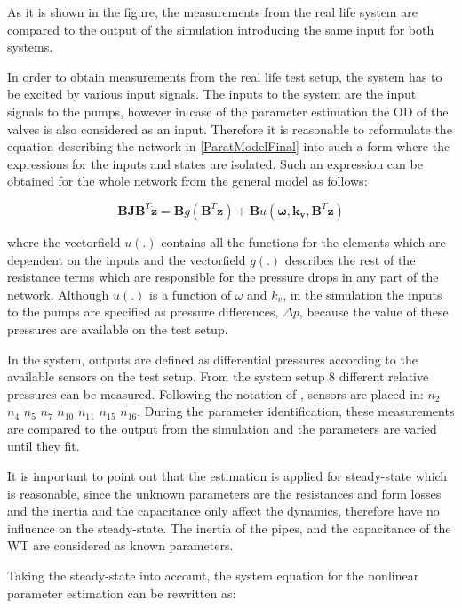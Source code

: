 As it is shown in the figure, the measurements from the real life system are compared to the output of the simulation introducing the same input for both systems. 

In order to obtain measurements from the real life test setup, the system has to be excited by various input signals. The inputs to the system are the input signals to the pumps, however in case of the parameter estimation the OD of the valves is also considered as an input. Therefore it is reasonable to reformulate the equation describing the network in \eqref{ParatModelFinal} into such a form where the expressions for the inputs and states are isolated. Such an expression can be obtained for the whole network from the general model as follows: 

\begin{equation}
 \pmb{B}\pmb{J {B}}^T \pmb{\dot{z}} = \pmb{B} g(\pmb{B}^T \pmb{z})+ \pmb{B} u(\pmb{\omega},\pmb{k_v	}, \pmb{B}^T \pmb{z})
 \label{InputOutputmodel}
\end{equation}

where the vectorfield $u(.)$ contains all the functions for the elements which are dependent on the inputs and the vectorfield $g(.)$ describes the rest of the resistance terms which are responsible for the pressure drops in any part of the network. Although $u(.)$ is a function of $\omega$ and $k_v$, in the simulation the inputs to the pumps are specified as pressure differences, $\Delta p$, because the value of these pressures are available on the test setup.

In the system, outputs are defined as differential pressures according to the available sensors on the test setup. From the system setup $8$ different relative pressures can be measured. Following the notation of , sensors are placed in: 
$n_2$ $n_4$ $n_5$ $n_7$ $n_{10}$ $n_{11}$ $n_{15}$ $n_{16}$. During the parameter identification, these measurements are compared to the output from the simulation and the parameters are varied until they fit.

It is important to point out that the estimation is applied for steady-state which is reasonable, since the unknown parameters are the resistances and form losses and the inertia and the capacitance only affect the dynamics, therefore have no influence on the steady-state. The inertia of the pipes, and the capacitance of the WT are considered as known parameters. 

Taking the steady-state into account, the system equation for the nonlinear parameter estimation can be rewritten as: 

